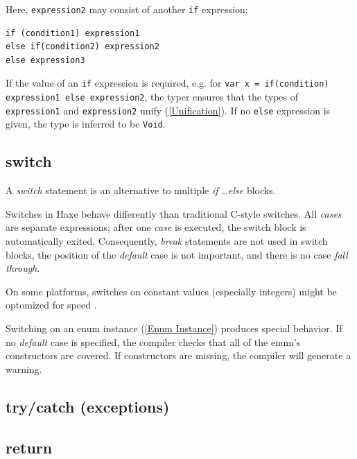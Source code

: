 \documentclass{article}
\newcommand{\type}[1]{\texttt{#1}}
\newcommand{\expr}[1]{\texttt{#1}}
\newcommand{\tref}[2]{#1 (\ref{#2})}
\newcommand{\haxe}[2][]{%
}
\begin{document}
Here, \expr{expression2} may consist of another \expr{if} expression:

\begin{lstlisting}
if (condition1) expression1
else if(condition2) expression2
else expression3
\end{lstlisting}

If the value of an \expr{if} expression is required, e.g. for \expr{var x = if(condition) expression1 else expression2}, the typer ensures that the types of \expr{expression1} and \expr{expression2} \tref{unify}{Unification}. If no \expr{else} expression is given, the type is inferred to be \type{Void}.


\subsection{switch}
\label{switch}
A \emph{switch} statement is an alternative to multiple \emph{if \ldots else} blocks.\haxe{assets/SwitchStatement.hx}

Switches in Haxe behave differently than traditional C-style switches.  All \emph{cases} are separate expressions; after one \emph{case} is executed, the switch block is automatically exited.  Consequently, \emph{break} statements are not used in switch blocks, the position of the \emph{default} case is not important, and there is no case \emph{fall through}.

On some platforms, switches on constant values (especially integers) might be optomized for speed .

Switching on an \tref{enum instance}{Enum Instance} produces special behavior.  If no \emph{default} case is specified, the compiler checks that all of the enum's constructors are covered.  If constructors are missing, the compiler will generate a warning.

\haxe{assets/SwitchEnum.hx}


\subsection{try/catch (exceptions)}
\label{try/catch}

\subsection{return}
\label{return}
\end{document}
